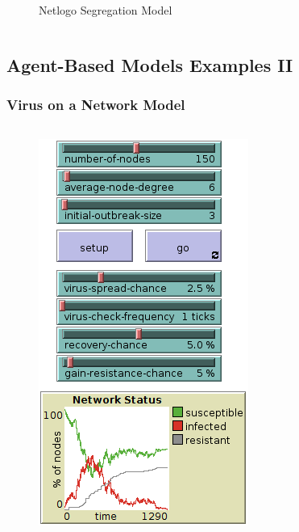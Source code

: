 \documentclass[compress]{beamer}
\begin{document}
\begin{frame}[Blank]
\begin{columns}
\begin{column}{0.5\textwidth}
\begin{figure}
                    \caption{Netlogo Segregation Model}
                    \label{fig:netlogosegregation}
                \end{figure}
            \end{column}
        \end{columns}
    \end{frame}

\subsection{Agent-Based Models Examples II}

    \begin{frame}[Blank] \frametitle{Virus on a Network Model}
        \begin{columns}
            \begin{column}{0.4\textwidth}
                \begin{figure}
                    \centering
                    \includegraphics[height=0.85\textheight]{../figures/netlogo_virus_on_a_network_2_zoomed}
                    \caption{}
                    \label{fig:netlogovirusonanetwork2zoomed}
                \end{figure}
            \end{column}
            \begin{column}{0.6\textwidth}
                \vspace{7mm}

\end{column}
\end{columns}
\end{frame}
\end{document}
